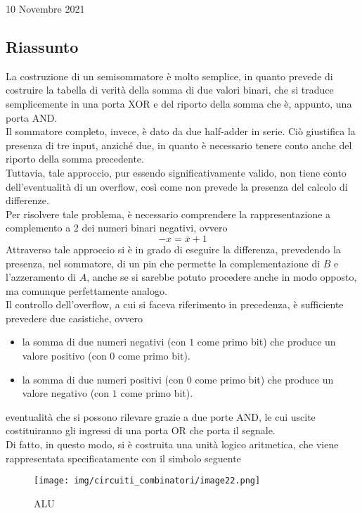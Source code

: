 \documentclass[a4paper]{extarticle}
\begin{document}
\newpage
\begin{center}
    10 Novembre 2021
\end{center}

\subsection{Riassunto}
La costruzione di un semisommatore è molto semplice, in quanto prevede di costruire la tabella di verità della somma di due valori binari, che si traduce semplicemente in una porta XOR e del riporto della somma che è, appunto, una porta AND.\\
Il sommatore completo, invece, è dato da due half-adder in serie. Ciò giustifica la presenza di tre input, anziché due, in quanto è necessario tenere conto anche del riporto della somma precedente.\\
Tuttavia, tale approccio, pur essendo significativamente valido, non tiene conto dell'eventualità di un overflow, così come non prevede la presenza del calcolo di differenze.\\
Per risolvere tale problema, è necessario comprendere la rappresentazione a complemento a \(2\) dei numeri binari negativi, ovvero
\[-x = \overline{x} + 1\]
Attraverso tale approccio si è in grado di eseguire la differenza, prevedendo la presenza, nel sommatore, di un pin che permette la complementazione di \(B\) e l'azzeramento di \(A\), anche se si sarebbe potuto procedere anche in modo opposto, ma comunque perfettamente analogo.\\
Il controllo dell'overflow, a cui si faceva riferimento in precedenza, è sufficiente prevedere due casistiche, ovvero
\begin{itemize}
    \item la somma di due numeri negativi (con \(1\) come primo bit) che produce un valore positivo (con \(0\) come primo bit).

    \item la somma di due numeri positivi (con \(0\) come primo bit) che produce un valore negativo (con \(1\) come primo bit).
\end{itemize}
eventualità che si possono rilevare grazie a due porte AND, le cui uscite costituiranno gli ingressi di una porta OR che porta il segnale.\\
Di fatto, in questo modo, si è costruita una unità logico aritmetica, che viene rappresentata specificatamente con il simbolo seguente

\begin{figure}[H]
    \centering
        \texttt{[image: img/circuiti\_combinatori/image22.png]}
    \caption{ALU}
    \label{fig:alu}
\end{figure}
\end{document}
